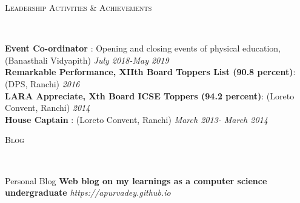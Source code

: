 \documentclass[9pt]{article}
\newenvironment{changemargin}[2]{%
  \begin{list}{}{%
    \setlength{\topsep}{0pt}%
    \setlength{\leftmargin}{#1}%
    \setlength{\rightmargin}{#2}%
    \setlength{\listparindent}{\parindent}%
    \setlength{\itemindent}{\parindent}%
    \setlength{\parsep}{\parskip}%
  }%
  \item[]}{\end{list}
}
\newcommand{\lineover}{
    \begin{changemargin}{-0.05in}{-0.05in}
        \vspace*{-8pt}
        \hrulefill \\
        \vspace*{-2pt}
    \end{changemargin}
}
\newcommand{\header}[1]{
    \begin{changemargin}{-0.5in}{-0.5in}
        \scshape{#1}\\
    \lineover
    \end{changemargin}
}
\newenvironment{body} {
    \vspace*{-16pt}
    \begin{changemargin}{-0.25in}{-0.5in}
  }
    {\end{changemargin}
}
\begin{document}
\smallskip

\header{Leadership Activities & Achievements}

\begin{body}
    \vspace{14pt}
    \textbf{Event Co-ordinator} : Opening and closing events of physical education, (Banasthali Vidyapith) \hfill {} \emph{July 2018-May 2019}\\
    \smallskip
    \textbf{Remarkable Performance, XIIth Board Toppers List (90.8 percent)}: (DPS, Ranchi) \hfill{} \emph{2016}\\
    \textbf{LARA Appreciate, Xth Board ICSE Toppers (94.2 percent)}: (Loreto Convent, Ranchi) \hfill{} \emph{2014}\\
    \textbf{House Captain} : (Loreto Convent, Ranchi) \hfill{} \emph{March 2013- March 2014}\\
\end{body}

\smallskip

\header{Blog}

\begin{body}
    \vspace{14pt}
    Personal Blog \textbf{Web blog on my learnings as a computer science undergraduate} \emph{ https://apurvadey.github.io}\\
    \smallskip
\end{body}

\smallskip
\end{document}
